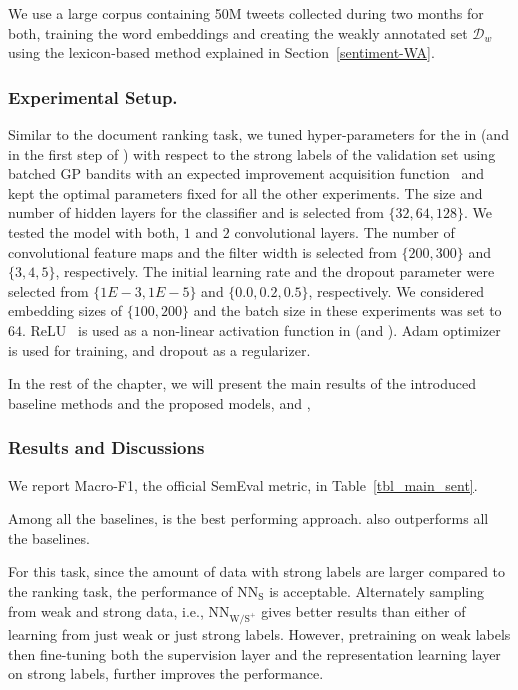 We use a large corpus containing 50M tweets collected during two months for both, training the word embeddings and creating the weakly annotated set $\mathcal{D}_w$ using the lexicon-based method explained in Section~\ref{sentiment-WA}. 

\subsubsection{Experimental Setup.}
Similar to the document ranking task, we tuned hyper-parameters for the \tnet in \cws (and \std in the first step of \fwl) with respect to the strong labels of the validation set using batched GP bandits with an expected improvement acquisition function~\citep{Desautels:2014} and kept the optimal parameters fixed for all the other experiments.  
The size and number of hidden layers for the classifier and is selected from $\{32, 64, 128\}$.
We tested the model with both, $1$ and $2$ convolutional layers. The number of convolutional feature maps and the filter width is selected from $\{200,300\}$ and $\{ 3, 4, 5\}$, respectively. The initial learning rate and the dropout parameter were selected from $\{1E-3, 1E-5\}$ and $\{0.0, 0.2, 0.5\}$, respectively. We considered embedding sizes of $\{100, 200\}$ and the batch size in these experiments was set to $64$. ReLU~\citep{Nair:2010} is used as a non-linear activation function in \tnet (and \std).  Adam optimizer~\citep{Kingma:2014} is used for training, and dropout as a regularizer.

In the rest of the chapter, we will present the main results of the introduced baseline methods and the proposed models, \cws and \fwl, 


\subsubsection{Results and Discussions} 

We report Macro-F1, the official SemEval metric, in Table~\ref{tbl_main_sent}. 

Among all the baselines, \fwl is the best performing approach. \cws also outperforms all the baselines. 

For this task, since the amount of data with strong labels are larger compared to the ranking task, the performance of $\text{NN}_{\text{S}}$ is acceptable. Alternately sampling from weak and strong data, i.e.,  $\text{NN}_{\text{W}\text{/S}^+}$ gives better results than either of learning from just weak or just strong labels. However, pretraining on weak labels then fine-tuning both the supervision layer and the representation learning layer on strong labels, further improves the performance.  


